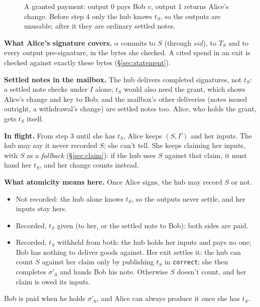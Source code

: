 \documentclass[11pt]{article}
\theoremstyle{plain}
\theoremstyle{definition}
\newcommand{\tx}[1]{\texttt{#1}}
\newcommand{\Vfy}{\mathsf{Verify}}
\newcommand{\Compl}{\mathsf{Complete}}
\newcommand{\sid}{\mathit{sid}}
\begin{document}
\begin{figure}[!tbp]
\caption{A granted payment: output 0 pays Bob $v$, output 1 returns
Alice's change. Before step 4 only the hub knows $t_S$, so the outputs
are unusable; after it they are ordinary settled notes.}
\label{fig:payment}
\end{figure}

\textbf{What Alice's signature covers.} $\alpha$ commits to $S$ (through
$\sid$), to $T_S$ and to every output pre-signature, in the bytes she
checked. A cited spend in an exit is checked against exactly these
bytes (\S\ref{sec:statement}).

\textbf{Settled notes in the mailbox.} The hub delivers completed
signatures, not $t_S$: a settled note checks under $I$ alone; $t_S$
would also need the grant, which shows Alice's change and key to Bob;
and the mailbox's other deliveries (notes issued outright, a
withdrawal's change) are settled notes too. Alice, who holds the grant,
gets $t_S$ itself.

\textbf{In flight.} From step 3 until she has $t_S$, Alice keeps $(S,
\Gamma)$ and her inputs. The hub may say it never recorded $S$; she
can't tell. She keeps claiming her inputs, with $S$ as a
\emph{fallback} (\S\ref{sec:claim}): if the hub uses $S$ against that
claim, it must hand her $t_S$, and her change counts instead.

\textbf{What atomicity means here.} Once Alice signs, the hub may record
$S$ or not.
\begin{itemize}[nosep]
\item Not recorded: the hub alone knows $t_S$, so the outputs never
  settle, and her inputs stay hers.
\item Recorded, $t_S$ given (to her, or the settled note to Bob): both
  sides are paid.
\item Recorded, $t_S$ withheld from both: the hub holds her inputs and
  pays no one; Bob has nothing to deliver goods against. Her exit
  settles it: the hub can count $S$ against her claim only by publishing
  $t_S$ in \tx{correct}; she then completes $\sigma'_0$ and hands Bob
  his note. Otherwise $S$ doesn't count, and her claim is owed its
  inputs.
\end{itemize}
Bob is paid when he holds $\sigma'_0$, and Alice can always produce it
once she has $t_S$.
\end{document}
